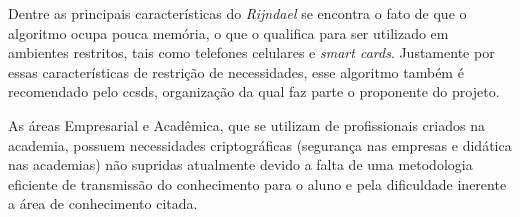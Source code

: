 Dentre as principais características do \textit{Rijndael} se encontra o fato de que o algoritmo ocupa pouca memória, o que o qualifica para ser utilizado em ambientes restritos, tais como telefones celulares e \textit{smart cards}. Justamente por essas características de restrição de necessidades, esse algoritmo também é recomendado pelo \acrfull{ccsds}, organização da qual faz parte o proponente do projeto.

As áreas Empresarial e Acadêmica, que se utilizam de profissionais criados na academia, possuem necessidades criptográficas (segurança nas empresas e didática nas academias) não supridas atualmente devido a falta de uma metodologia eficiente de transmissão do conhecimento para o aluno e pela dificuldade inerente a área de conhecimento citada. \cite{silva09} \cite{garmpis11} \cite{lopes12} \cite{younis20}
